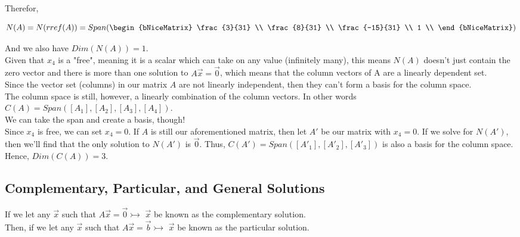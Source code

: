 Therefor,

\[
N(A) = N(rref(A)) =
%
Span(
%
\begin{bNiceMatrix}
	\frac{3}{31} \\
	\frac{8}{31} \\
	\frac{-15}{31} \\
	1 \\
\end{bNiceMatrix}
%
)
\]

And we also have $Dim(N(A)) = 1$.
\\

Given that $x_4$ is a "free", meaning it is a scalar which can take on any value (infinitely many), this means $N(A)$ doesn't just contain the zero vector and there is more than one solution to $A\vec{x} = \vec{0}$, which means that the column vectors of A are a linearly dependent set.
\\

Since the vector set (columns) in our matrix $A$ are not linearly independent, then they can't form a basis for the column space.
\\

The column space is still, however, a linearly combination of the column vectors. In other words $C(A) = Span([A_1], [A_2], [A_3], [A_4])$.
\\

We can take the span and create a basis, though!
\\

Since $x_4$ is free, we can set $x_4 = 0$. If $A$ is still our aforementioned matrix, then let $A'$ be our matrix with $x_4 = 0$. If we solve for $N(A')$, then we'll find that the only solution to $N(A')$ is $\vec{0}$. Thus, $C(A') = Span([A'_1], [A'_2], [A'_3])$ is also a basis for the column space. Hence, $Dim(C(A)) = 3$.
\\

\subsection{Complementary, Particular, and General Solutions}\label{concept3.2}

If we let any $\vec{x}$ such that $A\vec{x}=\vec{0}\rightarrowtail$ $\vec{x}$ be known as the complementary solution.
\\

Then, if we let any $\vec{x}$ such that $A\vec{x}=\vec{b}\rightarrowtail$ $\vec{x}$ be known as the particular solution.
\\

